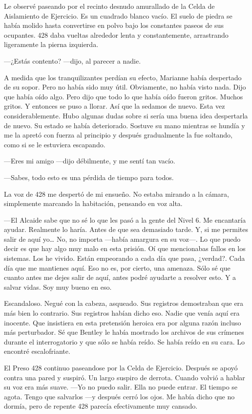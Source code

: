 Le observé paseando por el recinto desnudo amurallado de la Celda de
Aislamiento de Ejercicio. Es un cuadrado blanco vacío. El suelo de
piedra se había molido hasta convertirse en polvo bajo los constantes
paseos de sus ocupantes. 428 daba vueltas alrededor lenta y
constantemente, arrastrando ligeramente la pierna izquierda.

---¿Estás contento? ---dijo, al parecer a nadie.

A medida que los tranquilizantes perdían su efecto, Marianne había
despertado de su sopor. Pero no había sido muy útil. Obviamente, no
había visto nada. Dijo que había oído algo. Pero dijo que todo lo que
había oído fueron gritos. Muchos gritos. Y entonces se puso a llorar.
Así que la sedamos de nuevo. Esta vez considerablemente. Hubo algunas
dudas sobre si sería una buena idea despertarla de nuevo. Su estado se
había deteriorado. Sostuve su mano mientras se hundía y me la apretó con
fuerza al principio y después gradualmente la fue soltando, como si se
le estuviera escapando.

---Eres mi amigo ---dijo débilmente, y me sentí tan vacío.

---Sabes, todo esto es una pérdida de tiempo para todos.

La voz de 428 me despertó de mi ensueño. No estaba mirando a la cámara,
simplemente marcando la habitación, pensando en voz alta.

---El Alcaide sabe que no sé lo que les pasó a la gente del Nivel 6. Me
encantaría ayudar. Realmente lo haría. Antes de que sea demasiado tarde.
Y, si me permites salir de aquí yo\ldots{} No, no importa ---había
amargura en su voz---. Lo que puedo decir es que hay algo muy malo en
esta prisión. Oí que mencionabas fallos en los sistemas. Los he vivido.
Están empeorando a cada día que pasa, ¿verdad?. Cada día que me
mantienes aquí. Eso no es, por cierto, una amenaza. Sólo sé que cuanto
antes me dejes salir de aquí, antes podré ayudarte a resolver esto. Y a
salvar vidas. Soy muy bueno en eso.

Escandaloso. Negué con la cabeza, asqueado. Sus registros demostraban
que era más bien lo contrario. Sus registros habían dicho eso. Nadie que
venía aquí era inocente. Que insistiera en esta pretensión heroica era
por alguna razón incluso más perturbador. Sé que Bentley le había
mostrado los archivos de sus crímenes durante el interrogatorio y que
sólo se había reído. Se había reído en su cara. Lo encontré
escalofriante.

El Preso 428 continuo paseandose por la Celda de Ejercicio. Después se
apoyó contra una pared y suspiró. Un largo suspiro de derrota. Cuando
volvió a hablar su voz era más suave. ---Yo no puedo salir. Ella no
puede entrar. El tiempo se agota. Tengo que salvarlos ---y después cerró
los ojos. Me había dicho que no dormía, pero de repente 428 parecía
efectivamente muy cansado.

